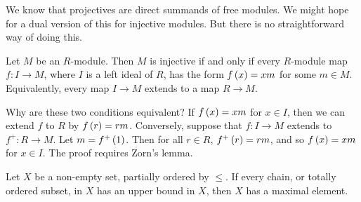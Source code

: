 \pagebreak

We know that projectives are direct summands of free modules. We might hope for a dual version of this for injective modules. But there is no straightforward way of doing this.


\begin{proposition}
Let $ M $ be an $ R $-module. Then $ M $ is injective if and only if every $ R $-module map $ f : I \to M $, where $ I $ is a left ideal of $ R $, has the form $ f\br{x} = xm $ for some $ m \in M $. Equivalently, every map $ I \to M $ extends to a map $ R \to M $.
\end{proposition}

Why are these two conditions equivalent? If $ f\br{x} = xm $ for $ x \in I $, then we can extend $ f $ to $ R $ by $ f\br{r} = rm $. Conversely, suppose that $ f : I \to M $ extends to $ f^+ : R \to M $. Let $ m = f^+\br{1} $. Then for all $ r \in R $, $ f^+\br{r} = rm $, and so $ f\br{x} = xm $ for $ x \in I $. The proof requires Zorn's lemma.

\begin{lemma}
Let $ X $ be a non-empty set, partially ordered by $ \le $. If every chain, or totally ordered subset, in $ X $ has an upper bound in $ X $, then $ X $ has a maximal element.
\end{lemma}

